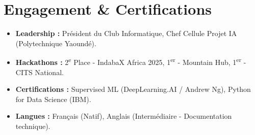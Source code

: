 \documentclass[a4paper,11pt]{article}
\begin{document}
\section{Engagement \& Certifications}
\begin{itemize}[leftmargin=*, nosep]
    \item \textbf{Leadership :} Président du Club Informatique, Chef Cellule Projet IA (Polytechnique Yaoundé).
    \item \textbf{Hackathons :} 2\textsuperscript{e} Place - IndabaX Africa 2025, 1\textsuperscript{er} - Mountain Hub, 1\textsuperscript{er} - CITS National.
    \item \textbf{Certifications :} Supervised ML (DeepLearning.AI / Andrew Ng), Python for Data Science (IBM).
    \item \textbf{Langues :} Français (Natif), Anglais (Intermédiaire - Documentation technique).
\end{itemize}
\end{document}
